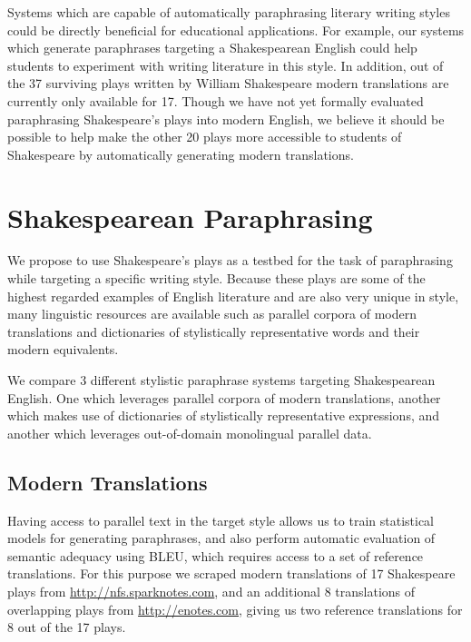 \documentclass[10pt,a5paper,twoside]{article}
\begin{document}
Systems which are capable of automatically paraphrasing literary writing styles could be directly beneficial for educational applications.  For example, our systems which generate paraphrases targeting
a Shakespearean English could help students to experiment with writing literature in this style.
In addition, out of the 37 surviving plays written by William Shakespeare modern translations are currently only available for 17.  Though we have not yet formally evaluated
paraphrasing Shakespeare's plays into modern English, we believe it should be possible to help make the other 20 plays more accessible to students of Shakespeare by automatically 
generating modern translations.

\section{Shakespearean Paraphrasing}
We propose to use Shakespeare's plays as a testbed for the task of paraphrasing while targeting a specific writing style.  Because these plays are some of the
highest regarded examples of English literature and are also very unique in style, many linguistic resources are available such as parallel corpora
of modern translations and dictionaries of stylistically representative words and their modern equivalents.

We compare 3 different stylistic paraphrase systems targeting Shakespearean English.  One which leverages parallel corpora of modern translations, another which makes use
of dictionaries of stylistically representative expressions, and another which leverages out-of-domain monolingual parallel data.

\subsection{Modern Translations}
Having access to parallel text in the target style allows us to train statistical models for generating paraphrases, and also perform automatic evaluation of semantic adequacy using BLEU, which requires access to a set of reference translations.  For this purpose we scraped modern translations of 17 Shakespeare plays from \url{http://nfs.sparknotes.com}, and an additional 8 translations of overlapping plays from \url{http://enotes.com}, giving us two reference translations for 8 out of the 17 plays.
\end{document}
